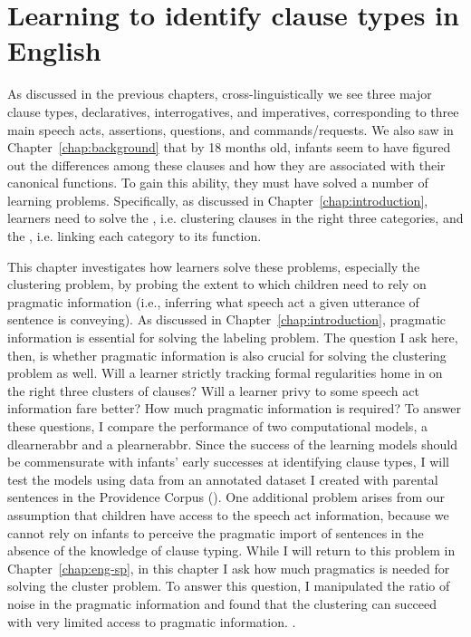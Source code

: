 \chapter{Learning to identify clause types in English}
\label{chap:eng-cl}


As discussed in the previous chapters, cross-linguistically we see three major clause types, declaratives, interrogatives, and imperatives, corresponding to three main speech acts, assertions, questions, and commands/requests. We also saw in Chapter~\ref{chap:background} that by 18 months old, infants seem to have figured out the differences among these clauses and how they are associated with their canonical functions.  To gain this ability, they must have solved a number of learning problems. Specifically, as discussed in Chapter~\ref{chap:introduction}, learners need to solve the , i.e. clustering clauses in the right three categories, and the , i.e. linking each category to its function. 

This chapter investigates how learners solve these problems, especially the clustering problem, by probing the extent to which children need to rely on pragmatic information (i.e., inferring what speech act a given utterance of sentence is conveying). As discussed in Chapter~\ref{chap:introduction}, pragmatic information is essential for solving the labeling problem. The question I ask here, then, is whether pragmatic information is also crucial for solving the clustering problem as well. Will a learner strictly tracking formal regularities home in on the right three clusters of clauses? Will a learner privy to some speech act information fare better? How much pragmatic information is required? To answer these questions, I compare the performance of two computational models, a \gls{dlearnerabbr} and a \gls{plearnerabbr}. Since the success of the learning models should be commensurate with infants' early successes at identifying clause types, I will test the models using data from an annotated dataset I created with parental sentences in the Providence Corpus (\cite{ProvidenceCorpus}). One additional problem arises from our assumption that children have access to the speech act information, because we cannot rely on infants to perceive the pragmatic import of sentences in the absence of the knowledge of clause typing. While I will return to this problem in Chapter~\ref{chap:eng-sp}, in this chapter I ask how much pragmatics is needed for solving the cluster problem. To answer this question, I manipulated the ratio of noise in the pragmatic information and found that the clustering can succeed with very limited access to pragmatic information. . 

